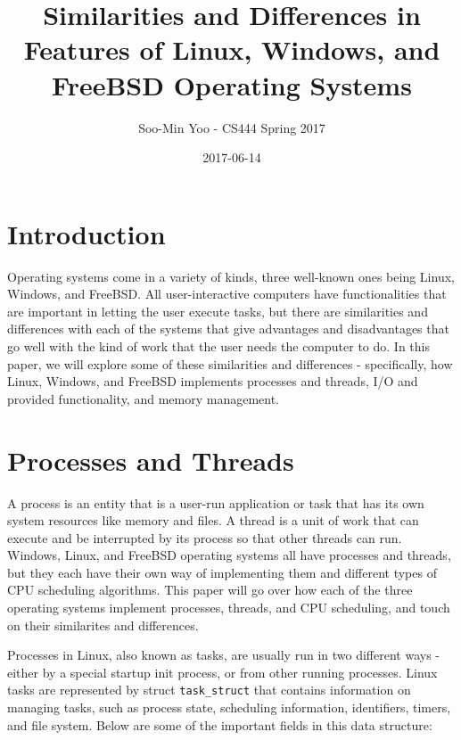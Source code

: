 \documentclass[10pt,draftclsnofoot,onecolumn,letterpaper]{IEEEtran}
\begin{document}
\title{Similarities and Differences in Features of Linux, Windows, and FreeBSD Operating Systems}
\author{Soo-Min Yoo - CS444 Spring 2017}
\date{2017-06-14}
\maketitle{}


\section{Introduction}

Operating systems come in a variety of kinds, three well-known ones being Linux, Windows, and FreeBSD. All user-interactive computers have functionalities that are important in letting the user execute tasks, but there are similarities and differences with each of the systems that give advantages and disadvantages that go well with the kind of work that the user needs the computer to do. In this paper, we will explore some of these similarities and differences - specifically, how Linux, Windows, and FreeBSD implements processes and threads, I/O and provided functionality, and memory management.


\section{Processes and Threads}

A process is an entity that is a user-run application or task that has its own system resources like memory and files. A thread is a unit of work that can execute and be interrupted by its process so that other threads can run. Windows, Linux, and FreeBSD operating systems all have processes and threads, but they each have their own way of implementing them and different types of CPU scheduling algorithms. This paper will go over how each of the three operating systems implement processes, threads, and CPU scheduling, and touch on their similarites and differences. \par

Processes in Linux, also known as tasks, are usually run in two different ways - either by a special startup init process, or from other running processes. Linux tasks are represented by struct \verb!task_struct! that contains information on managing tasks, such as process state, scheduling information, identifiers, timers, and file system. Below are some of the important fields in this data structure\cite{1}: \par
\end{document}
